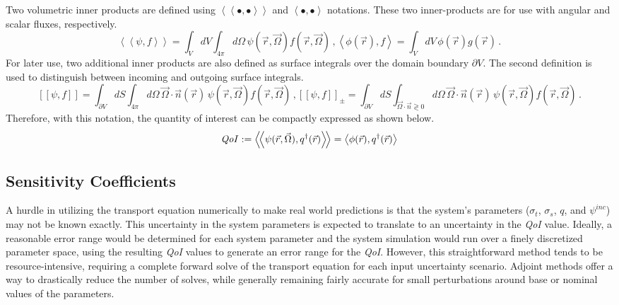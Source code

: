 \documentclass[12pt]{report}
\newcommand{\vr}{\vec{r}}
\newcommand{\vO}{\vec{\Omega}}
\newcommand{\bra}{\left\langle}
\newcommand{\ket}{\right\rangle}
\newcommand{\braSN}{\left\langle \! \left\langle}
\newcommand{\ketSN}{\right\rangle \! \right\rangle}
\newcommand{\sbraSN}{\left[ \! \left[}
\newcommand{\sketSN}{\right] \! \right]}
\newcommand{\bound}{\partial V}
\newcommand{\vn}{\vec{n}}
\newcommand{\sigt}{\sigma_t}
\newcommand{\sigs}{\sigma_s}
\newcommand{\scalResp}{q^\dag}
\newcommand{\qoi}{{\it QoI}\xspace}
\begin{document}
Two volumetric inner products are defined using $\braSN \bullet , \bullet \ketSN$ and $\bra \bullet , \bullet \ket$ notations. These two inner-products are for use with angular and scalar fluxes, respectively. 
\begin{subequations}
\begin{equation}
\braSN \psi , f \ketSN  = \int_V dV \int_{4 \pi} d \Omega \,  \psi(\vr, \vO)f(\vr, \vO) \,,
\end{equation}
\begin{equation}
\bra \phi(\vr) , f \ket  = \int_V dV \,  \phi(\vr) g(\vr) \,.
\end{equation}
\end{subequations}
For later use, two additional inner products are also defined as surface integrals over the domain 
boundary $\partial V$. The second definition is used to distinguish between incoming and outgoing surface integrals.
\begin{subequations}
\begin{equation}
\sbraSN \psi , f \sketSN  = \int_{\bound} dS \int_{4 \pi} d \Omega \, \vO \cdot \vn(\vr) \, \psi(\vr, \vO)f(\vr, \vO) \,,
\end{equation}
\begin{equation}
\sbraSN \psi , f \sketSN_{\pm}   = \int_{\bound} dS \int_{\vO \cdot \vn \gtrless 0} d\Omega \,  \vO \cdot \vn(\vr) \, \psi(\vr, \vO)f(\vr, \vO) \,.
\end{equation}
\end{subequations}
Therefore, with this notation, the quantity of interest can be compactly expressed as shown below.
\begin{equation}
\label{QoIDef}
\qoi := \braSN \psi(\vr,\vO), \scalResp(\vr) \ketSN  = \bra \phi(\vr) , \scalResp(\vr) \ket
\end{equation}

\subsection{Sensitivity Coefficients}
A hurdle in utilizing the transport equation numerically to make real world predictions is that 
the system's parameters ($\sigt$, $\sigs$, $q$, and $\psi^{inc}$) may not be known exactly. This uncertainty in 
the system parameters is expected to translate to an uncertainty in the \qoi value. Ideally, a reasonable error 
range would be determined for each system parameter and the system simulation would run over a finely 
discretized parameter space, using the resulting \qoi values to generate an error range for the \qoi. 
However, this straightforward method tends to be resource-intensive, requiring a complete forward solve 
of the transport equation for each input uncertainty scenario. Adjoint methods offer a way to drastically 
reduce the number of solves, while generally remaining fairly accurate for small perturbations around 
base or nominal values of the parameters.
\end{document}
